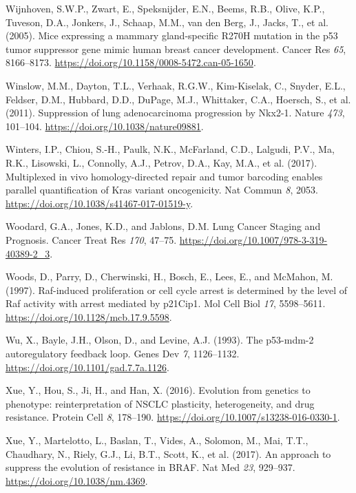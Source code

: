 \begin{CSLReferences}{0}{0}
\leavevmode{}%
Wijnhoven, S.W.P., Zwart, E., Speksnijder, E.N., Beems, R.B., Olive, K.P., Tuveson, D.A., Jonkers, J., Schaap, M.M., van den Berg, J., Jacks, T., et al. (2005). Mice expressing a mammary gland-specific R270H mutation in the p53 tumor suppressor gene mimic human breast cancer development. Cancer Res \emph{65}, 8166--8173. \url{https://doi.org/10.1158/0008-5472.can-05-1650}.

\leavevmode{}%
Winslow, M.M., Dayton, T.L., Verhaak, R.G.W., Kim-Kiselak, C., Snyder, E.L., Feldser, D.M., Hubbard, D.D., DuPage, M.J., Whittaker, C.A., Hoersch, S., et al. (2011). Suppression of lung adenocarcinoma progression by Nkx2-1. Nature \emph{473}, 101--104. \url{https://doi.org/10.1038/nature09881}.

\leavevmode{}%
Winters, I.P., Chiou, S.-H., Paulk, N.K., McFarland, C.D., Lalgudi, P.V., Ma, R.K., Lisowski, L., Connolly, A.J., Petrov, D.A., Kay, M.A., et al. (2017). Multiplexed in vivo homology-directed repair and tumor barcoding enables parallel quantification of Kras variant oncogenicity. Nat Commun \emph{8}, 2053. \url{https://doi.org/10.1038/s41467-017-01519-y}.

\leavevmode{}%
Woodard, G.A., Jones, K.D., and Jablons, D.M. Lung Cancer Staging and Prognosis. Cancer Treat Res \emph{170}, 47--75. \url{https://doi.org/10.1007/978-3-319-40389-2_3}.

\leavevmode{}%
Woods, D., Parry, D., Cherwinski, H., Bosch, E., Lees, E., and McMahon, M. (1997). Raf-induced proliferation or cell cycle arrest is determined by the level of Raf activity with arrest mediated by p21Cip1. Mol Cell Biol \emph{17}, 5598--5611. \url{https://doi.org/10.1128/mcb.17.9.5598}.

\leavevmode{}%
Wu, X., Bayle, J.H., Olson, D., and Levine, A.J. (1993). The p53-mdm-2 autoregulatory feedback loop. Genes Dev \emph{7}, 1126--1132. \url{https://doi.org/10.1101/gad.7.7a.1126}.

\leavevmode{}%
Xue, Y., Hou, S., Ji, H., and Han, X. (2016). Evolution from genetics to phenotype: reinterpretation of NSCLC plasticity, heterogeneity, and drug resistance. Protein Cell \emph{8}, 178--190. \url{https://doi.org/10.1007/s13238-016-0330-1}.

\leavevmode{}%
Xue, Y., Martelotto, L., Baslan, T., Vides, A., Solomon, M., Mai, T.T., Chaudhary, N., Riely, G.J., Li, B.T., Scott, K., et al. (2017). An approach to suppress the evolution of resistance in BRAF. Nat Med \emph{23}, 929--937. \url{https://doi.org/10.1038/nm.4369}.


\end{CSLReferences}
